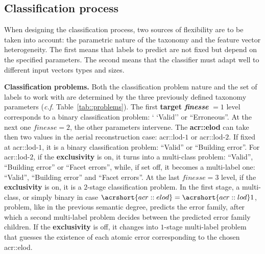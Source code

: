\documentclass[runningheads]{llncs}
\begin{document}
\subsection{Classification process}

When designing the classification process, two sources of flexibility are to be taken into account: the parametric nature of the taxonomy and the feature vector heterogeneity. The first means that labels to predict are not fixed but depend on the specified parameters. The second means that the classifier must adapt well to different input vectors types and sizes.

\noindent
\textbf{Classification problems.}
Both the classification problem nature and the set of labels to work with are determined by the three previously defined taxonomy parameters (\textit{c.f.} Table~\ref{tab::problems}). The first \textbf{target \textit{finesse}} $= 1$ level corresponds to a binary classification problem: ` `Valid'' or ``Erroneous''. At the next one $\textit{finesse}=2$, the other parameters intervene. The \textbf{\acrshort{acr::elod}} can take then two values in the aerial reconstruction case: \acrshort{acr::lod}-$1$ or \acrshort{acr::lod}-$2$. If fixed at \acrshort{acr::lod}-$1$, it is a binary classification problem: ``Valid'' or ``Building error''. For \acrshort{acr::lod}-$2$, if the \textbf{exclusivity} is on, it turns into a multi-class problem: ``Valid'', ``Building error'' or ``Facet errors'', while, if set off, it becomes a multi-label one: ``Valid'', ``Building error'' and ``Facet errors''. At the last $\textit{finesse}=3$ level, if the \textbf{exclusivity} is on, it is a $2$-stage classification problem. In the first stage, a multi-class, or simply binary in case $\acrshort{acr::elod} = \acrshort{acr::lod}1$, problem, like in the previous semantic degree, predicts the error family, after which a second multi-label problem decides between the predicted error family children. If the \textbf{exclusivity} is off, it changes into  $1$-stage multi-label problem that guesses the existence of each atomic error corresponding to the chosen \acrshort{acr::elod}.
\end{document}
